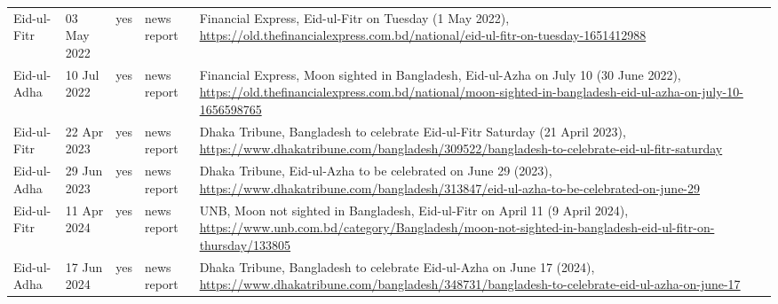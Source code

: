 \begin{longtable}{L{2.0cm} L{1.8cm} C{0.8cm} L{1.8cm} L{8.6cm}}
Eid-ul-Fitr & 03 May 2022 & yes & news report & Financial Express, Eid-ul-Fitr on Tuesday (1 May 2022), \url{https://old.thefinancialexpress.com.bd/national/eid-ul-fitr-on-tuesday-1651412988} \\
Eid-ul-Adha & 10 Jul 2022 & yes & news report & Financial Express, Moon sighted in Bangladesh, Eid-ul-Azha on July 10 (30 June 2022), \url{https://old.thefinancialexpress.com.bd/national/moon-sighted-in-bangladesh-eid-ul-azha-on-july-10-1656598765} \\
Eid-ul-Fitr & 22 Apr 2023 & yes & news report & Dhaka Tribune, Bangladesh to celebrate Eid-ul-Fitr Saturday (21 April 2023), \url{https://www.dhakatribune.com/bangladesh/309522/bangladesh-to-celebrate-eid-ul-fitr-saturday} \\
Eid-ul-Adha & 29 Jun 2023 & yes & news report & Dhaka Tribune, Eid-ul-Azha to be celebrated on June 29 (2023), \url{https://www.dhakatribune.com/bangladesh/313847/eid-ul-azha-to-be-celebrated-on-june-29} \\
Eid-ul-Fitr & 11 Apr 2024 & yes & news report & UNB, Moon not sighted in Bangladesh, Eid-ul-Fitr on April 11 (9 April 2024), \url{https://www.unb.com.bd/category/Bangladesh/moon-not-sighted-in-bangladesh-eid-ul-fitr-on-thursday/133805} \\
Eid-ul-Adha & 17 Jun 2024 & yes & news report & Dhaka Tribune, Bangladesh to celebrate Eid-ul-Azha on June 17 (2024), \url{https://www.dhakatribune.com/bangladesh/348731/bangladesh-to-celebrate-eid-ul-azha-on-june-17} \\
\end{longtable}
\endgroup
